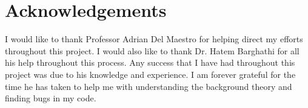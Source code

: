 \chapter*{Acknowledgements}
I would like to thank Professor Adrian Del Maestro for helping direct my efforts throughout this project. I would also like to thank Dr. Hatem Barghathi for all his help throughout this process. Any success that I have had throughout this project was due to his knowledge and experience. I am forever grateful for the time he has taken to help me with understanding the background theory and finding bugs in my code.